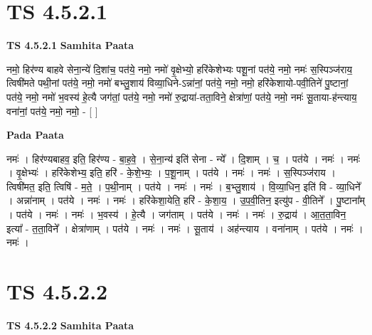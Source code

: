 \documentclass[17pt]{extarticle}
\begin{document}
\section*{ TS 4.5.2.1 }

\textbf{TS 4.5.2.1 } \newline
\textbf{Samhita Paata} \newline

नमो॒ हिर॑ण्य बाहवे सेना॒न्ये॑ दि॒शांच॒ पत॑ये॒ नमो॒                        नमो॑ वृ॒क्षेभ्यो॒ हरि॑केशेभ्यः पशू॒नां पत॑ये॒ नमो॒                नमः॑ स॒स्पिञ्ज॑राय॒ त्विषी॑मते पथी॒नां पत॑ये॒ नमो॒                    नमो॑ बभ्लु॒शाय॑ विव्या॒धिने-ऽन्ना॑नां॒ पत॑ये॒ नमो॒                  नमो॒ हरि॑केशायो-पवी॒तिने॑ पु॒ष्टानां॒ पत॑ये॒ नमो॒                                 नमो॑ भ॒वस्य॑ हे॒त्यै जग॑तां॒ पत॑ये॒ नमो॒                                                नमो॑ रु॒द्राया॑-तता॒विने॒ क्षेत्रा॑णां॒ पत॑ये॒ नमो॒                          नमः॑ सू॒ताया-ह॑न्त्याय॒ वना॑नां॒ पत॑ये॒ नमो॒ नमो॒ - [  ] \newline

\textbf{Pada Paata} \newline

नमः॑ । हिर॑ण्यबाहव॒ इति॒ हिर॑ण्य - बा॒ह॒वे॒ । से॒ना॒न्य॑ इति॑ सेना - न्ये᳚ । दि॒शाम् । च॒ । पत॑ये । नमः॑ । नमः॑ । वृ॒क्षेभ्यः॑ । हरि॑केशेभ्य॒ इति॒ हरि॑ - के॒शे॒भ्यः॒ । प॒शू॒नाम् । पत॑ये । नमः॑ । नमः॑ । स॒स्पिञ्ज॑राय । त्विषी॑मत॒ इति॒ त्विषि॑ - म॒ते॒ । प॒थी॒नाम् । पत॑ये । नमः॑ । नमः॑ । ब॒भ्लु॒शाय॑ । वि॒व्या॒धिन॒ इति॑ वि - व्या॒धिने᳚ । अन्ना॑नाम् । पत॑ये । नमः॑ । नमः॑ । हरि॑केशा॒येति॒ हरि॑ - के॒शा॒य॒ । उ॒प॒वी॒तिन॒ इत्यु॑प - वी॒तिने᳚ । पु॒ष्टाना᳚म् । पत॑ये । नमः॑ । नमः॑ । भ॒वस्य॑ । हे॒त्यै । जग॑ताम् । पत॑ये । नमः॑ । नमः॑ । रु॒द्राय॑ । आ॒त॒ता॒विन॒ इत्या᳚ - त॒ता॒विने᳚ । क्षेत्रा॑णाम् । पत॑ये । नमः॑ । नमः॑ । सू॒ताय॑ । अह॑न्त्याय । वना॑नाम् । पत॑ये । नमः॑ । नमः॑ ।  \newline




\section*{ TS 4.5.2.2 }

\textbf{TS 4.5.2.2 } \newline
\textbf{Samhita Paata} \newline
\end{document}
